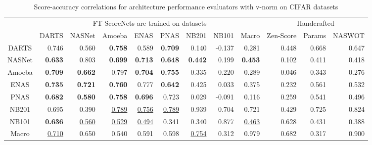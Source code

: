 \documentclass[lettersize,journal]{IEEEtran}
\begin{document}
            \begin{table*}
            \caption{Score-accuracy correlations for architecture performance evaluators with v-norm on CIFAR datasets}
            \label{tab:score_accuracy_correlation}
            \centering
            \begin{tabular}{c|rrrrrrrr|rrr}
            \toprule
                &\multicolumn{8}{c|}{FT-ScoreNets are trained on datasets \cite{nds, nb201, nb101, macro}}& \multicolumn{3}{c}{Handcrafted} \\
                \cmidrule(r){2-9} \cmidrule(r){10-12}
                & DARTS & NASNet & Amoeba & ENAS & PNAS & NB201 & NB101 & Macro & Zen-Score \cite{Zen-NAS} & Params & NASWOT \cite{naswot}\\
                \midrule
                DARTS & 0.746 & 0.560 & \textbf{0.758} & 0.589 & \textbf{0.709}& 0.140 & -0.137 & 0.281 & 0.448 & 0.668 & 0.647\\
                NASNet & \textbf{0.633} & 0.803 & \textbf{0.699} & \textbf{0.713} & \textbf{0.648} & \textbf{0.442} & 0.199 & \textbf{0.453} & 0.102 & 0.411 & 0.418 \\
                Amoeba & \textbf{0.709} & \textbf{0.662} & 0.797 & \textbf{0.704} & \textbf{0.755} &0.335 & 0.220 & 0.289& -0.046 & 0.343 & 0.276\\
                ENAS & \textbf{0.735} & \textbf{0.721} & \textbf{0.760} & 0.777 & \textbf{0.642} &  0.425 & 0.033 & 0.375&  0.232 & 0.561 & 0.532\\
                PNAS & \textbf{0.682} & \textbf{0.580} & \textbf{0.758} & \textbf{0.696} & 0.723 & 0.029 & -0.091 & 0.116 & 0.259 & 0.541 & 0.496\\
                NB201 & 0.695 & 0.390 & \underline{0.789} & \underline{0.756} & \underline{0.789} & 0.939 & 0.704 & 0.721 &  0.429 & 0.725 & 0.824\\
                NB101 & \textbf{0.636} & \underline{0.560} & \underline{0.529} & \underline{0.494} & 0.341 & 0.340 & 0.877 & \underline{0.463} & 0.628 & 0.431 & 0.388\\
                Macro & \underline{0.710} & 0.650 & 0.540 & 0.591 & 0.598 & \underline{0.754} & 0.312 & 0.979& 0.682 & 0.317 & 0.900 \\
            \bottomrule
          \end{tabular}
          \end{table*}
\end{document}
